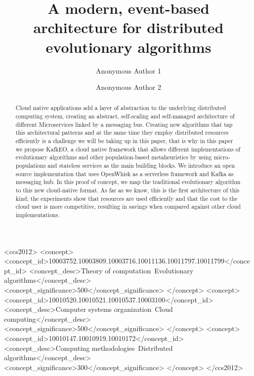 \documentclass[sigconf]{acmart}
\begin{document}
\title{A modern, event-based architecture for distributed evolutionary algorithms}

\author{Anonymous Author 1}

\author{Anonymous Author 2}

\renewcommand{\shortauthors}{A. Author et al.}


\begin{abstract}
  Cloud native applications add a layer of abstraction to the
underlying distributed computing system, creating an abstract,
self-scaling and self-managed architecture of different Microservices
linked by a messaging bus. Creating new algorithms that tap this
architectural patterns and at the same time they employ distributed
resources efficiently is a challenge we will be taking up in this
paper, that is why in this paper we propose KafkEO, a cloud native
framework that allows different implementations of evolutionary
algorithms and other population-based metaheuristics by using
micro-populations and stateless services as the main building
blocks. We introduce an open source implementation that uses OpenWhisk
as a serverless framework and Kafka as messaging hub. In this proof of
concept, we map the traditional evolutionary algorithm to this new
cloud-native format.  As far as we know, this is the first
architecture of this kind; the experiments show that resources are
used efficiently and that the cost to the cloud user is more
competitive, resulting in savings when compared against other cloud
implementations.
\end{abstract}

\begin{CCSXML}
<ccs2012>
<concept>
<concept_id>10003752.10003809.10003716.10011136.10011797.10011799</concept_id>
<concept_desc>Theory of computation~Evolutionary algorithms</concept_desc>
<concept_significance>500</concept_significance>
</concept>
<concept>
<concept_id>10010520.10010521.10010537.10003100</concept_id>
<concept_desc>Computer systems organization~Cloud computing</concept_desc>
<concept_significance>500</concept_significance>
</concept>
<concept>
<concept_id>10010147.10010919.10010172</concept_id>
<concept_desc>Computing methodologies~Distributed algorithms</concept_desc>
<concept_significance>300</concept_significance>
</concept>
</ccs2012>
\end{CCSXML}
\end{document}
